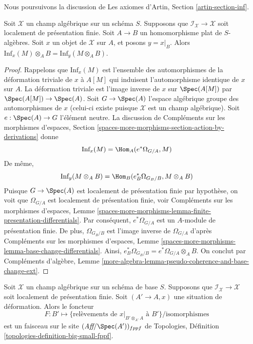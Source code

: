 \noindent
Nous poursuivons la discussion de
Les axiomes d'Artin, Section \ref{artin-section-inf}.

\begin{lemma}
\label{lemma-inf-quasi-coherent}
Soit $\mathcal{X}$ un champ algébrique sur un schéma $S$.
Supposons que $\mathcal{I}_\mathcal{X} \to \mathcal{X}$ soit localement
de présentation finie. Soit $A \to B$ un homomorphisme plat de $S$-algèbres.
Soit $x$ un objet de $\mathcal{X}$ sur $A$, et posons $y = x|_B$.
Alors $\text{Inf}_x(M) \otimes_A B = \text{Inf}_y(M \otimes_A B)$.
\end{lemma}

\begin{proof}
Rappelons que $\text{Inf}_x(M)$ est l'ensemble des automorphismes de la
déformation triviale de $x$ à $A[M]$ qui induisent l'automorphisme
identique de $x$ sur $A$. La déformation triviale est
l'image inverse de $x$ sur $\Spec(A[M])$ par $\Spec(A[M]) \to \Spec(A)$.
Soit $G \to \Spec(A)$ l'espace algébrique groupe des automorphismes de $x$
(celui-ci existe puisque $\mathcal{X}$ est un champ algébrique).
Soit $e : \Spec(A) \to G$ l'élément neutre.
La discussion de Compléments sur les morphismes d'espaces, Section
\ref{spaces-more-morphisms-section-action-by-derivations}
donne
$$
\text{Inf}_x(M) = \Hom_A(e^*\Omega_{G/A}, M)
$$
De même,
$$
\text{Inf}_y(M \otimes_A B) = \Hom_B(e_B^*\Omega_{G_B/B}, M \otimes_A B)
$$
Puisque $G \to \Spec(A)$ est localement de présentation finie par
hypothèse, on voit que $\Omega_{G/A}$ est localement de
présentation finie, voir
Compléments sur les morphismes d'espaces, Lemme
\ref{spaces-more-morphisms-lemma-finite-presentation-differentials}.
Par conséquent, $e^*\Omega_{G/A}$ est un $A$-module de présentation finie.
De plus, $\Omega_{G_B/B}$ est l'image inverse de $\Omega_{G/A}$ d'après
Compléments sur les morphismes d'espaces, Lemme
\ref{spaces-more-morphisms-lemma-base-change-differentials}.
Ainsi, $e_B^*\Omega_{G_B/B} = e^*\Omega_{G/A} \otimes_A B$.
On conclut par Compléments d'algèbre, Lemme
\ref{more-algebra-lemma-pseudo-coherence-and-base-change-ext}.
\end{proof}

\begin{lemma}
\label{lemma-sheaf-of-infinitesimal-lifts}
Soit $\mathcal{X}$ un champ algébrique sur un schéma de base $S$.
Supposons que $\mathcal{I}_\mathcal{X} \to \mathcal{X}$ soit localement
de présentation finie. Soit $(A' \to A, x)$ une situation de déformation.
Alors le foncteur
$$
F : B' \longmapsto
\{\text{relèvements de }x|_{B' \otimes_{A'} A}\text{ à } B'\}/\text{isomorphismes}
$$
est un faisceau sur le site $(\textit{Aff}/\Spec(A'))_{fppf}$ de
Topologies, Définition \ref{topologies-definition-big-small-fppf}.
\end{lemma}


